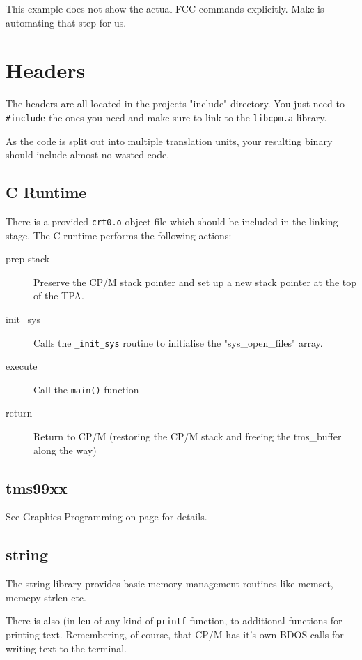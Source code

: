 \documentclass[10pt,a4paper,hidelinks]{article}
\begin{document}
This example does not show the actual FCC commands explicitly.  Make is
automating that step for us.
\pagebreak

\section{Headers}

The headers are all located in the projects "include" directory.  You just need
to \texttt{\#include} the ones you need and make sure to link to the
\texttt{libcpm.a} library.

As the code is split out into multiple translation units, your resulting binary
should include almost no wasted code.


\subsection{C Runtime}

There is a provided \texttt{crt0.o} object file which should be included in the
linking stage.  The C runtime performs the following actions:

\begin{description}
  \item[prep stack] Preserve the CP/M stack pointer and set up a new stack
    pointer at the top of the TPA.
  \item[init\_sys] Calls the \texttt{\_init\_sys} routine to initialise the
    "sys\_open\_files" array.
  \item[execute] Call the \texttt{main()} function
  \item[return] Return to CP/M (restoring the CP/M stack and freeing the
    tms\_buffer along the way)
\end{description}

\subsection{tms99xx}

See Graphics Programming on page \pageref{graphicsprogramming} for details.

\subsection{string}

The string library provides basic memory management routines like memset, memcpy
strlen etc.

There is also (in leu of any kind of \texttt{printf} function, to additional
functions for printing text.  Remembering, of course, that CP/M has it's own
BDOS calls for writing text to the terminal.
\end{document}
